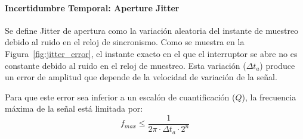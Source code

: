 \paragraph{Incertidumbre Temporal: Aperture Jitter}
Se define Jitter de apertura como la variación aleatoria del instante de muestreo debido al ruido en el reloj de sincronismo. Como se muestra en la Figura~\ref{fig:jitter_error}, el instante exacto en el que el interruptor se abre no es constante debido al ruido en el reloj de muestreo. Esta variación ($\Delta t_a$) produce un error de amplitud que depende de la velocidad de variación de la señal. 

Para que este error sea inferior a un escalón de cuantificación ($Q$), la frecuencia máxima de la señal está limitada por:
\begin{equation}
    f_{max} \leq \frac{1}{2\pi \cdot \Delta t_a \cdot 2^n}
\end{equation}


\begin{marginfigure}
    \centering
    \shorthandoff{>}
    \caption[Relación entre jitter temporal y error de amplitud.]{Relación entre el jitter temporal ($\Delta t_a$) y el error de amplitud ($\Delta V$). A mayor pendiente de la señal, más crítico es el ruido de fase del reloj.}\label{fig:jitter_error}
\end{marginfigure}

